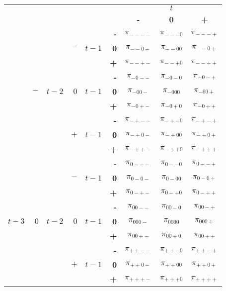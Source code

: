 \documentclass{article}[]
\begin{document}
\begin{center}
\begin{tabular}{r | r | r | r | r | r | c c c | }
 \multicolumn{5}{r}{} & \multicolumn{1}{r}{} &	\multicolumn{3}{c}{$t$} \\ \cline{7-9}
 \multicolumn{5}{r}{} & 		& \textbf{-} & \textbf{0} & \textbf{+} \\ \cline{2-2} \cline{4-4} \cline{6-9}
&&&&&   \textbf{-} & $\pi_{----}$	& $\pi_{---0}$	& $\pi_{---+}$ \\ 
&&&  $-$ &$t-1$ & \textbf{0} & $\pi_{--0-}$	& $\pi_{--00}$	& $\pi_{--0+}$	\\
&&&&&    \textbf{+} & $\pi_{--+-}$	& $\pi_{--+0}$	& $\pi_{--++}$ \\ \cline{4-4} \cline{6-9}
&&&&&    \textbf{-} & $\pi_{-0--}$	& $\pi_{-0-0}$	& $\pi_{-0-+}$ \\ 
& $-$ & $t-2$ & $0$   &$t-1$ & \textbf{0} & $\pi_{-00-}$	& $\pi_{-000}$	& $\pi_{-00+}$	\\
&&&&&    \textbf{+} & $\pi_{-0+-}$	& $\pi_{-0+0}$	& $\pi_{-0++}$ \\  \cline{4-4} \cline{6-9}
&&&&&    \textbf{-} & $\pi_{-+--}$	& $\pi_{-+-0}$	& $\pi_{-+-+}$ \\ 
&&&$+$   &$t-1$ & \textbf{0} & $\pi_{-+0-}$	& $\pi_{-+00}$	& $\pi_{-+0+}$	\\
&&&&&    \textbf{+} & $\pi_{-++-}$	& $\pi_{-++0}$	& $\pi_{-+++}$ \\ \cline{2-2} \cline{4-4} \cline{6-9}

&&&&&    \textbf{-} & $\pi_{0---}$	& $\pi_{0--0}$	& $\pi_{0--+}$ \\ 
&&& $-$ &$t-1$ & \textbf{0} & $\pi_{0-0-}$	& $\pi_{0-00}$	& $\pi_{0-0+}$	\\
&&&&& \textbf{+} & $\pi_{0-+-}$	& $\pi_{0-+0}$	& $\pi_{0-++}$ \\ \cline{4-4} \cline{6-9}
&&&&&    \textbf{-} & $\pi_{00--}$	& $\pi_{00-0}$	& $\pi_{00-+}$ \\ 
$t-3$ & $0$ & $t-2$ & $0$   &$t-1$ & \textbf{0} & $\pi_{000-}$	& $\pi_{0000}$	& $\pi_{000+}$	\\
&&&&&    \textbf{+} & $\pi_{00+-}$	& $\pi_{00+0}$	& $\pi_{00++}$ \\ \cline{4-4} \cline{6-9}
&&&&& \textbf{-} & $\pi_{++--}$	& $\pi_{++-0}$	& $\pi_{++-+}$ \\ 
& & &$+$   &$t-1$ & \textbf{0} & $\pi_{++0-}$	& $\pi_{++00}$	& $\pi_{++0+}$	\\
&&&&& \textbf{+} & $\pi_{+++-}$	& $\pi_{+++0}$	& $\pi_{++++}$ \\ \cline{2-2} \cline{4-4} \cline{6-9}


\end{tabular}
\end{center}
\end{document}
